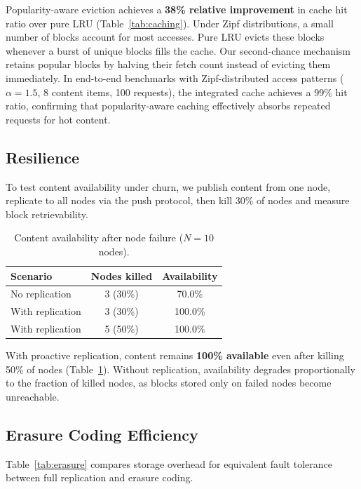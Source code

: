\documentclass[sigconf,nonacm]{acmart}
\begin{document}
Popularity-aware eviction achieves a \textbf{38\% relative improvement} in cache hit ratio over pure LRU (Table~\ref{tab:caching}). Under Zipf distributions, a small number of blocks account for most accesses. Pure LRU evicts these blocks whenever a burst of unique blocks fills the cache. Our second-chance mechanism retains popular blocks by halving their fetch count instead of evicting them immediately. In end-to-end benchmarks with Zipf-distributed access patterns ($\alpha{=}1.5$, 8 content items, 100 requests), the integrated cache achieves a 99\% hit ratio, confirming that popularity-aware caching effectively absorbs repeated requests for hot content.

\subsection{Resilience}

To test content availability under churn, we publish content from one node, replicate to all nodes via the push protocol, then kill 30\% of nodes and measure block retrievability.

\begin{table}[t]
\caption{Content availability after node failure ($N = 10$ nodes).}
\label{tab:resilience}
\centering
\begin{tabular}{lcc}
\toprule
Scenario & Nodes killed & Availability \\
\midrule
No replication & 3 (30\%) & 70.0\% \\
With replication & 3 (30\%) & 100.0\% \\
With replication & 5 (50\%) & 100.0\% \\
\bottomrule
\end{tabular}
\end{table}

With proactive replication, content remains \textbf{100\% available} even after killing 50\% of nodes (Table~\ref{tab:resilience}). Without replication, availability degrades proportionally to the fraction of killed nodes, as blocks stored only on failed nodes become unreachable.

\subsection{Erasure Coding Efficiency}

Table~\ref{tab:erasure} compares storage overhead for equivalent fault tolerance between full replication and erasure coding.
\end{document}
